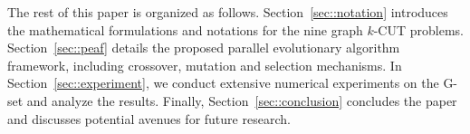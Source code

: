 \documentclass[12pt, a4paper]{article}%
\numberwithin{equation}{section}
\theoremstyle{plain}
\begin{document}
\begin{itemize}
	\end{itemize}
	
	The rest of this paper is organized as follows. Section~\ref{sec::notation} introduces the mathematical formulations and notations for the nine graph $k$-CUT problems. Section~\ref{sec::peaf} details the proposed parallel evolutionary algorithm framework, including crossover, mutation and selection mechanisms. In Section~\ref{sec::experiment}, we conduct extensive numerical experiments on the G-set and analyze the results. Finally, Section~\ref{sec::conclusion} concludes the paper and discusses potential avenues for future research.
	
	
	
\end{document}

